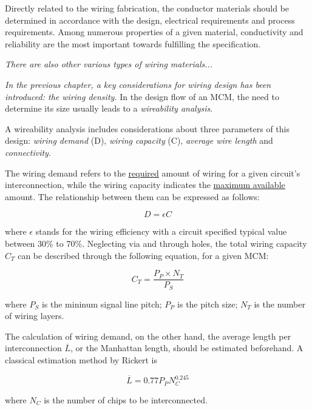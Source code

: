 \begin{spacing}{1.5}
Directly related to the wiring fabrication, the conductor materials should be determined in accordance with the design, electrical requirements and process requirements. Among numerous properties of a given material, conductivity and reliability are the most important towards fulfilling the specification. \cite{chen2006vlsi}

\textit{There are also other various types of wiring materials... }

\textit{In the previous chapter, a key considerations for wiring design has been introduced: the wiring density.} In the design flow of an MCM, the need to determine its size usually leads to a \textit{wireability analysis}. 

A wireability analysis includes considerations about three parameters of this design: \textit{wiring demand} (D), \textit{wiring capacity} (C), \textit{average wire length} and \textit{connectivity}. 

The wiring demand refers to the \underline{required} amount of wiring for a given circuit's interconnection, while the wiring capacity indicates the \underline{maximum available} amount. The relationship between them can be expressed as follows: 

\begin{equation}
    \label{eq.demand} 
    D=\epsilon C
\end{equation}

where $\epsilon$ stands for the wiring efficiency with a circuit specified typical value between 30\% to 70\%. Neglecting via and through holes, the total wiring capacity $C_T$ can be described through the following equation, for a given MCM: 

\begin{equation}
    \label{eq.capacity}
    C_T=\frac{P_P\times N_T}{P_S}
\end{equation}

where $P_S$ is the mininum signal line pitch; $P_P$ is the pitch size; $N_T$ is the number of wiring layers. 

The calculation of wiring demand, on the other hand, the average length per interconnection $\overline{L}$, or the Manhattan length, should be estimated beforehand. A classical estimation method by Rickert is 

\begin{equation}
    \label{eq.rickert}
    \overline{L}=0.77P_PN_C^{0.245}
\end{equation}

where $N_C$ is the number of chips to be interconnected. 


\end{spacing}
